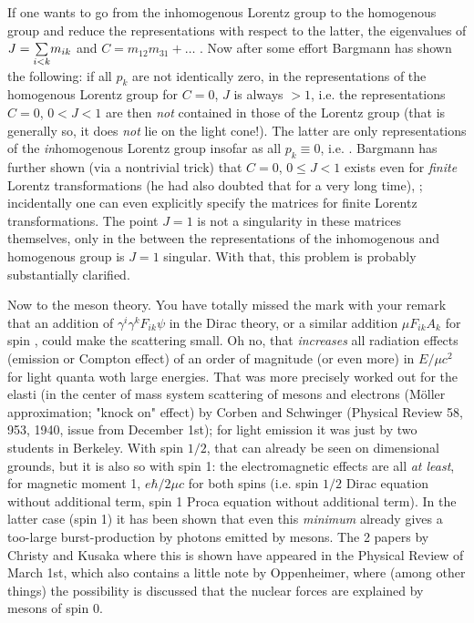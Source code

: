 If one wants to go from the inhomogenous Lorentz group to the homogenous group and reduce the representations with respect to the latter, the eigenvalues of $J=\underset{i<k}{\sum}m_{ik}$ and $C=m_{12}m_{31} + \dots$ . Now after some effort Bargmann has shown the following: if all $p_k$ are not identically zero, in the representations of the homogenous Lorentz group for $C=0$, $J$ is always $>1$, i.e. the representations $C=0$, $0<J<1$ are then \textit{not} contained in those of the Lorentz group (that is generally so, it does \textit{not} lie on the light cone!). The latter are only representations of the \textit{in}homogenous Lorentz group insofar as all $p_k \equiv 0$, i.e. . Bargmann has further shown (via a nontrivial trick) that $C=0$, $0 \le J < 1$ exists even for \textit{finite} Lorentz transformations (he had also doubted that for a very long time), ; incidentally one can even explicitly specify the matrices for finite Lorentz transformations. The point $J=1$ is not a singularity in these matrices themselves, only in the  between the representations of the inhomogenous and homogenous group is $J=1$ singular. With that, this problem is probably substantially clarified.

Now to the meson theory. You have totally missed the mark with your remark that an addition of $\gamma^i\gamma^kF_{ik}\psi$ in the Dirac theory, or a similar addition $\mu F_{ik}A_k$ for spin 
, could make the scattering small. Oh no, that \textit{increases} all radiation effects (emission or Compton effect) of an order of magnitude (or even more) in $E/\mu c^2$ for light quanta woth large energies. That was more precisely worked out for the elasti   (in the center of mass system scattering of mesons and electrons (M\"oller approximation; "knock on" effect) by Corben and Schwinger (Physical Review 58, 953, 1940, issue from December 1st); for light emission it was just  by two students in Berkeley. With spin $1/2$, that can already be seen on dimensional grounds, but it is also so with spin 1: the electromagnetic effects are all \textit{at least}, for magnetic moment 1, $e\hbar/2\mu c$ for both spins (i.e. spin $1/2$ Dirac equation without additional term, spin 1 Proca equation without additional term). In the latter case (spin 1) it has been shown that even this \textit{minimum} already gives a too-large burst-production by photons emitted by mesons. The 2 papers by Christy and Kusaka where this is shown have appeared in the Physical Review of March 1st, which also contains a little note by Oppenheimer, where (among other things) the possibility is discussed that the nuclear forces are explained by mesons of spin 0.

